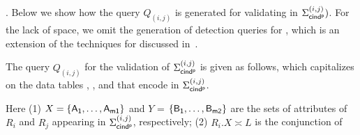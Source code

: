 

. Below we show how the \SQL query $Q_{(i,j)}$ is generated for
validating \pCINDs in $\Sigma_{{\mathsf{cind^p}}}^{(i,j)})$. %
For the lack of space, we omit the generation of detection queries for \pCFDs, which is an extension of
the \SQL techniques for \CFDs discussed in~\cite{CFDs,icde08}.



The query $Q_{(i,j)}$ for the validation of $\Sigma_{{\mathsf{cind^p}}}^{(i,j)}$
is given as follows, which capitalizes on the data tables
\Enc{}, ,  and \Enc{\ne} that encode \pCINDs in
$\Sigma_{{\mathsf{cind^p}}}^{(i,j)}$.



\begin{footnotesize}
\end{footnotesize}

\noindent Here (1) $X = \{\protect\mathsf{A_1,\dots, A_{m1}}\}$ and $Y$ =
$\{\protect\mathsf{B_1,\dots, B_{m2}}\}$ are the sets of attributes of $R_i$ and
 $R_j$ appearing in $\Sigma_{{\mathsf{cind^p}}}^{(i,j)}$, respectively;
(2) $R_i.X\asymp L$ is the conjunction of


\begin{footnotesize}
\end{footnotesize}

